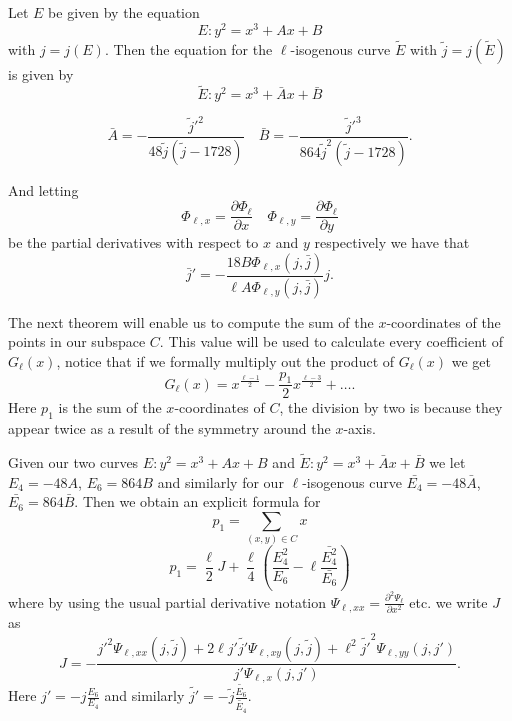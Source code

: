 \begin{thm}
 Let $E$ be given by the equation
$$ E: y^2 = x^3 + Ax + B $$
with $j = j(E)$. Then the equation for the $\ell$-isogenous curve $\tilde{E}$ with
$\tilde{j} = j(\tilde{E})$ is given by
$$ \tilde{E}: y^2 = x^3 + \bar{A}x + \bar{B} $$

$$\bar{A} = -\frac{\tilde{j}'^2}{48 \tilde{j}(\tilde{j} - 1728)} \quad
  \bar{B} = -\frac{\tilde{j}'^3}{864 \tilde{j}^2(\tilde{j} - 1728)}. $$

And letting $$\Phi_{\ell, x} = \frac{\partial \Phi_\ell}{\partial x} \quad
              \Phi_{\ell, y} = \frac{\partial \Phi_\ell}{\partial y}$$
be the partial derivatives with respect to $x$ and $y$ respectively we have that
$$ \bar{j}' = -\frac{18 B \Phi_{\ell, x}(j, \bar{j})}{\ell A \Phi_{\ell, y}(j, \bar{j})} j. $$
\end{thm}
The next theorem will enable us to compute the sum of the $x$-coordinates of the points in
our subspace $C$. This value will be used to calculate every coefficient of $G_\ell(x)$, notice
that if we formally multiply out the product of $G_\ell(x)$ we get
$$ G_\ell(x) = x^\frac{\ell-1}{2} - \frac{p_1}{2} x^\frac{\ell-3}{2} + \ldots. $$
Here $p_1$ is the sum of the $x$-coordinates of $C$, the division by two is because they
appear twice as a result of the symmetry around the $x$-axis.
\begin{thm}
 Given our two curves $E: y^2 = x^3 + Ax + B$ and $\tilde{E}: y^2 = x^3 + \bar{A}x + \bar{B}$ we let
$E_4 = -48A$, $E_6 = 864B$ and similarly for our $\ell$-isogenous curve $\bar{E_4} = -48\bar{A}$,
$\bar{E_6} = 864\bar{B}$. Then we obtain an explicit formula for
$$ p_1 = \sum_{(x,y)\in C} x $$
$$ p_1 = \frac{\ell}{2}J + \frac{\ell}{4} \left( \frac{E_4^2}{E_6} - \ell \frac{\bar{E_4^2}}{\bar{E_6}} \right) $$
where by using the usual partial derivative notation $\Psi_{\ell, xx} = \frac{\partial^2 \Psi_\ell}{\partial x^2}$
etc. we write $J$ as 
$$ J = -\frac{j'^2 \Psi_{\ell, xx}(j, \tilde{j}) + 2\ell j' \tilde{j'} \Psi_{\ell, xy}(j, \tilde{j})
+\ell^2 \tilde{j'}^2 \Psi_{\ell, yy}(j, j')}{j' \Psi_{\ell, x}(j, j')}. $$
Here $j'= -j \frac{E_6}{E_4}$ and similarly $\tilde{j'} = -\tilde{j} \frac{\tilde{E_6}}{\tilde{E_4}}$.
\end{thm}

